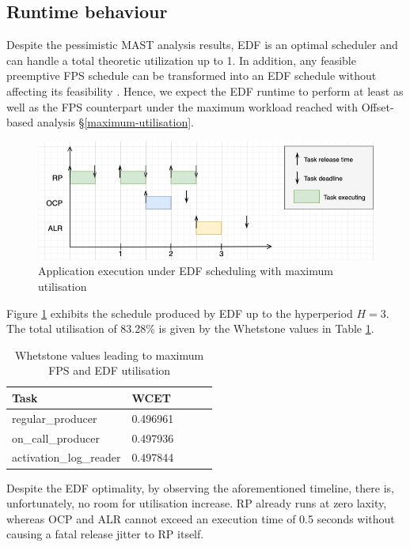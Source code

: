 \documentclass{article}
\begin{document}
\subsection{Runtime behaviour}

Despite the pessimistic MAST analysis results, EDF is an optimal scheduler and can handle a total theoretic utilization up to 1. In addition, any feasible preemptive FPS schedule can be transformed into an EDF schedule without affecting its feasibility \cite{spuri}. Hence, we expect the EDF runtime to perform at least as well as the FPS counterpart under the maximum workload reached with Offset-based analysis §\ref{maximum-utilisation}.

\begin{figure}[!htbp]
   \centering
   \includegraphics[width=6in]{images/timeline-edf-offsets}
   \caption{Application execution under EDF scheduling with maximum utilisation}
   \label{fig:timeline-edf-offsets}
\end{figure}

Figure \ref{fig:timeline-edf-offsets} exhibits the schedule produced by EDF up to the hyperperiod $H=3$. The total utilisation of 83.28\% is given by the Whetstone values in Table \ref{tab:Whet-max-util}.

\begin{table}[!htbp]
   \centering
   \begin{tabular}{lllcl}
    \toprule
    Task & WCET \\
    \midrule
    regular\_producer & 0.496961     \\
    on\_call\_producer & 0.497936     \\
    activation\_log\_reader & 0.497844 \\
    \toprule
   \end{tabular}
   \caption{Whetstone values leading to maximum FPS and EDF utilisation}
   \label{tab:Whet-max-util}
 \end{table}

\newpage

Despite the EDF optimality, by observing the aforementioned timeline, there is, unfortunately, no room for utilisation increase. RP already runs at zero laxity, whereas OCP and ALR cannot exceed an execution time of 0.5 seconds without causing a fatal release jitter to RP itself.
\end{document}
